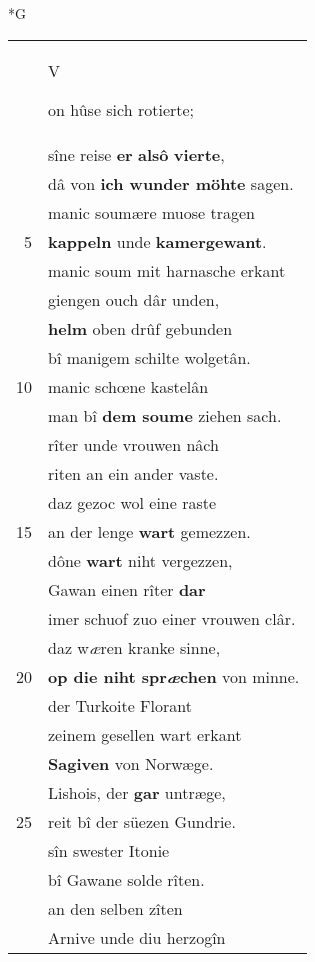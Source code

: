 \documentclass[8pt,a4paper,notitlepage]{article}
\begin{document}
\newpage
\begin{table}[ht]
\begin{minipage}[t]{0.5\linewidth}
\small
\begin{center}*G
\end{center}
\begin{tabular}{rl}
 & \begin{large}V\end{large}on hûse sich rotierte;\\ 
 & sîne reise \textbf{er} \textbf{alsô} \textbf{vierte},\\ 
 & dâ von \textbf{ich wunder möhte} sagen.\\ 
 & manic soumære muose tragen\\ 
5 & \textbf{kappeln} unde \textbf{kamergewant}.\\ 
 & manic soum mit harnasche erkant\\ 
 & giengen ouch dâr unden,\\ 
 & \textbf{helm} oben drûf gebunden\\ 
 & bî manigem schilte wolgetân.\\ 
10 & manic schœne kastelân\\ 
 & man bî \textbf{dem soume} ziehen sach.\\ 
 & rîter unde vrouwen nâch\\ 
 & riten an ein ander vaste.\\ 
 & daz gezoc wol eine raste\\ 
15 & an der lenge \textbf{wart} gemezzen.\\ 
 & dône \textbf{wart} niht vergezzen,\\ 
 & Gawan einen rîter \textbf{dar}\\ 
 & imer schuof zuo einer vrouwen clâr.\\ 
 & daz w\textit{æ}ren kranke sinne,\\ 
20 & \textbf{op die niht spr\textit{æ}chen} von minne.\\ 
 & der Turkoite Florant\\ 
 & zeinem gesellen wart erkant\\ 
 & \textbf{Sagiven} von Norwæge.\\ 
 & Lishois, der \textbf{gar} untræge,\\ 
25 & reit bî der süezen Gundrie.\\ 
 & sîn swester Itonie\\ 
 & bî Gawane solde rîten.\\ 
 & an den selben zîten\\ 
 & Arnive unde diu herzogîn\\ 

\end{tabular}
\end{minipage}
\end{table}
\end{document}

